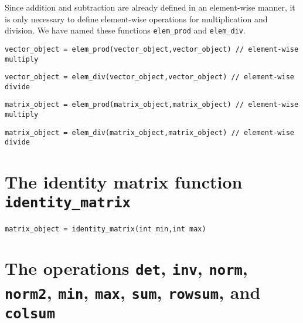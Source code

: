 \documentclass{admbmanual}
\begin{document}
Since addition and subtraction are already defined in an element-wise manner,
it is only necessary to define element-wise operations 
for multiplication and
division. We have named these functions \texttt{elem\_prod} and \texttt{elem\_div}.

\begin{lstlisting}
vector_object = elem_prod(vector_object,vector_object) // element-wise multiply 
\end{lstlisting}

\begin{lstlisting}
vector_object = elem_div(vector_object,vector_object) // element-wise divide
\end{lstlisting}

\begin{lstlisting}
matrix_object = elem_prod(matrix_object,matrix_object) // element-wise multiply 
\end{lstlisting}

\begin{lstlisting}
matrix_object = elem_div(matrix_object,matrix_object) // element-wise divide
\end{lstlisting}



\section{The identity matrix function \texttt{identity\_matrix}}

\begin{lstlisting}
matrix_object = identity_matrix(int min,int max)
\end{lstlisting}


\section{The operations \texttt{det},  \texttt{inv},  \texttt{norm}, \texttt{norm2}, \br \texttt{min},  \texttt{max},  \texttt{sum},  \texttt{rowsum}, and \texttt{colsum}}
\end{document}
